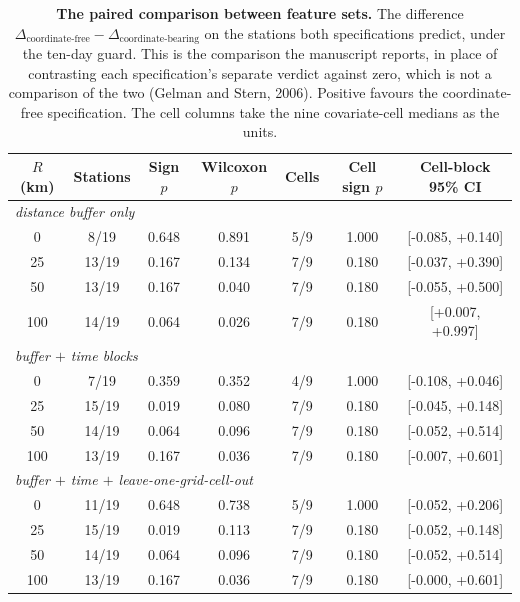 \documentclass[11pt]{article}
\begin{document}
\begin{table}[htbp]\centering\footnotesize
\caption{\textbf{The paired comparison between feature sets.} The difference $\Delta_{\text{coordinate-free}}-\Delta_{\text{coordinate-bearing}}$ on the stations both specifications predict, under the ten-day guard. This is the comparison the manuscript reports, in place of contrasting each specification's separate verdict against zero, which is not a comparison of the two (Gelman and Stern, 2006). Positive favours the coordinate-free specification. The cell columns take the nine covariate-cell medians as the units.}
\begin{tabular}{ccccccc}\toprule
$R$ (km) & Stations & Sign $p$ & Wilcoxon $p$ & Cells & Cell sign $p$ & Cell-block 95\% CI \\ \midrule
\multicolumn{7}{l}{\textit{distance buffer only}} \\
0 & 8/19 & 0.648 & 0.891 & 5/9 & 1.000 & [-0.085, +0.140] \\
25 & 13/19 & 0.167 & 0.134 & 7/9 & 0.180 & [-0.037, +0.390] \\
50 & 13/19 & 0.167 & 0.040 & 7/9 & 0.180 & [-0.055, +0.500] \\
100 & 14/19 & 0.064 & 0.026 & 7/9 & 0.180 & [+0.007, +0.997] \\
\multicolumn{7}{l}{\textit{buffer $+$ time blocks}} \\
0 & 7/19 & 0.359 & 0.352 & 4/9 & 1.000 & [-0.108, +0.046] \\
25 & 15/19 & 0.019 & 0.080 & 7/9 & 0.180 & [-0.045, +0.148] \\
50 & 14/19 & 0.064 & 0.096 & 7/9 & 0.180 & [-0.052, +0.514] \\
100 & 13/19 & 0.167 & 0.036 & 7/9 & 0.180 & [-0.007, +0.601] \\
\multicolumn{7}{l}{\textit{buffer $+$ time $+$ leave-one-grid-cell-out}} \\
0 & 11/19 & 0.648 & 0.738 & 5/9 & 1.000 & [-0.052, +0.206] \\
25 & 15/19 & 0.019 & 0.113 & 7/9 & 0.180 & [-0.052, +0.148] \\
50 & 14/19 & 0.064 & 0.096 & 7/9 & 0.180 & [-0.052, +0.514] \\
100 & 13/19 & 0.167 & 0.036 & 7/9 & 0.180 & [-0.000, +0.601] \\
\bottomrule\end{tabular}\end{table}
\end{document}
